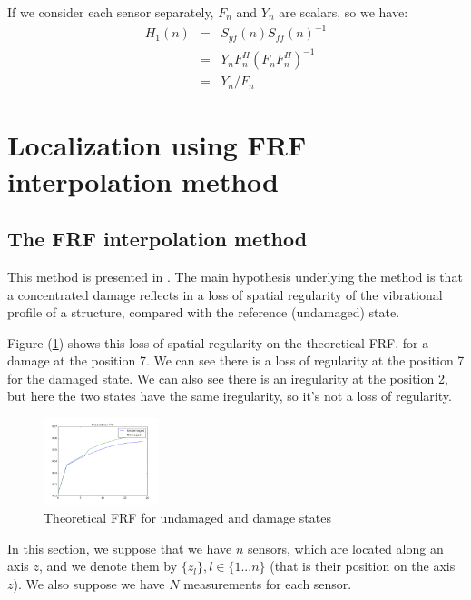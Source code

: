\documentclass[journal]{IEEEtran}
\begin{document}
\begin{remark}
If we consider each sensor separately, $F_n$ and $Y_n$ are scalars, so we have:
\begin{equation}
\begin{array}{lll}
H_1(n) & = & S_{yf}(n) S_{ff}(n)^{-1} \\
& = & Y_n F_n^H (F_n F_n^H)^{-1} \\
& = & Y_n / F_n
\end{array}
\end{equation}
\end{remark}

\section{Localization using FRF interpolation method}

\subsection{The FRF interpolation method}

This method is presented in \cite{dilena2015damage}.
The main hypothesis underlying the method is that a concentrated damage reflects in a loss of spatial regularity of the
vibrational profile of a structure, compared with the reference (undamaged) state.

Figure (\ref{theo}) shows this loss of spatial regularity on the theoretical FRF, for a damage at the position 7.
We can see there is a loss of regularity at the position 7 for the damaged state. We can also see there is an iregularity at the position 2, but here the two states have the same iregularity, so it's not a loss of regularity.

\begin{figure}[h!]
  \centering
  \includegraphics[width=0.3\textwidth]{images/theo60.png}
  \caption{Theoretical FRF for undamaged and damage states}
  \label{theo}
\end{figure}


In this section, we suppose that we have $n$ sensors, which are located along an axis $z$, and we denote them by
$\{z_l\}, l\in \{1 ... n\}$ (that is their position on the axis $z$). We also suppose we have $N$ measurements for each sensor.
\end{document}
